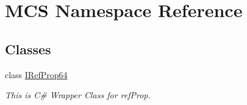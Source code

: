 \hypertarget{namespace_m_c_s}{}\section{M\+CS Namespace Reference}
\label{namespace_m_c_s}
\subsection*{Classes}
\begin{DoxyCompactItemize}
\item 
class \hyperlink{class_m_c_s_1_1_i_ref_prop64}{I\+Ref\+Prop64}
\begin{DoxyCompactList}\small\item\em This is C\# Wrapper Class for ref\+Prop. \end{DoxyCompactList}\end{DoxyCompactItemize}
